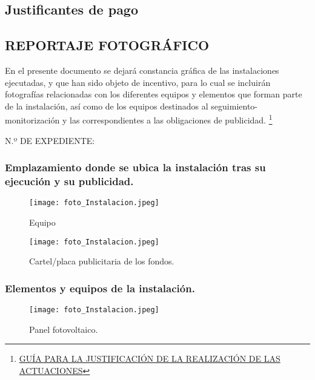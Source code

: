 \documentclass{article}
\begin{document}
\subsection{Justificantes de pago}



\subsection{REPORTAJE FOTOGRÁFICO}
En el presente documento se dejará constancia gráfica de las instalaciones ejecutadas, y que han sido
objeto de incentivo, para lo cual se incluirán fotografías relacionadas con los diferentes equipos y
elementos que forman parte de la instalación, así como de los equipos destinados al seguimiento-
monitorización y las correspondientes a las obligaciones de publicidad.
\footnote{\href{https://sede.idae.gob.es/lang/extras/tramites-servicios/2020/Apoyo_EERR/Guia_JUSTIFICACION_Realizacion_Actuaciones_FEDER_EERR_ELE_2022_03_08.pdf}{GUÍA PARA LA JUSTIFICACIÓN DE LA REALIZACIÓN DE LAS ACTUACIONES}}

N.º DE EXPEDIENTE:

\subsubsection{Emplazamiento donde se ubica la instalación tras su ejecución y su publicidad.} 
\begin{figure}[h]
    \caption{Equipo }
    \centering
    \texttt{[image: foto\_Instalacion.jpeg]}
\end{figure}

\begin{figure}[h]
    \caption{Cartel/placa publicitaria de los fondos.}
    \centering
    \texttt{[image: foto\_Instalacion.jpeg]}
\end{figure}

\subsubsection{Elementos y equipos de la instalación.} 
\begin{figure}[h]
    \caption{Panel fotovoltaico.}
    \centering
    \texttt{[image: foto\_Instalacion.jpeg]}
\end{figure}
\end{document}
